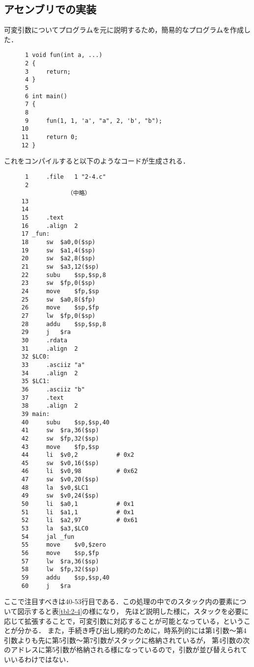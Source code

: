 \documentclass[a4j,11pt]{jarticle}
\begin{document}
\subsection{アセンブリでの実装}

可変引数についてプログラムを元に説明するため，簡易的なプログラムを作成した．

\begin{verbatim}
      1	void fun(int a, ...)
      2	{
      3	    return;
      4	}
      5	
      6	int main()
      7	{
      8	
      9	    fun(1, 1, 'a', "a", 2, 'b', "b");
     10	
     11	    return 0;
     12	}      
\end{verbatim}

これをコンパイルすると以下のようなコードが生成される．

\begin{verbatim}
      1		.file	1 "2-4.c"
      2	
                  （中略）
     13	
     14	
     15		.text
     16		.align	2
     17	_fun:
     18		sw	$a0,0($sp)
     19		sw	$a1,4($sp)
     20		sw	$a2,8($sp)
     21		sw	$a3,12($sp)
     22		subu	$sp,$sp,8
     23		sw	$fp,0($sp)
     24		move	$fp,$sp
     25		sw	$a0,8($fp)
     26		move	$sp,$fp
     27		lw	$fp,0($sp)
     28		addu	$sp,$sp,8
     29		j	$ra
     30		.rdata
     31		.align	2
     32	$LC0:
     33		.asciiz	"a"
     34		.align	2
     35	$LC1:
     36		.asciiz	"b"
     37		.text
     38		.align	2
     39	main:
     40		subu	$sp,$sp,40
     41		sw	$ra,36($sp)
     42		sw	$fp,32($sp)
     43		move	$fp,$sp
     44		li	$v0,2			# 0x2
     45		sw	$v0,16($sp)
     46		li	$v0,98			# 0x62
     47		sw	$v0,20($sp)
     48		la	$v0,$LC1
     49		sw	$v0,24($sp)
     50		li	$a0,1			# 0x1
     51		li	$a1,1			# 0x1
     52		li	$a2,97			# 0x61
     53		la	$a3,$LC0
     54		jal	_fun
     55		move	$v0,$zero
     56		move	$sp,$fp
     57		lw	$ra,36($sp)
     58		lw	$fp,32($sp)
     59		addu	$sp,$sp,40
     60		j	$ra       
\end{verbatim}

ここで注目すべきは40-53行目である．この処理の中でのスタック内の要素について図示すると表\ref{tbl:2-4}の様になり，
先ほど説明した様に，スタックを必要に応じて拡張することで，可変引数に対応することが可能となっている，ということが分かる．
また，手続き呼び出し規約のために，時系列的には第1引数〜第4引数よりも先に第5引数〜第7引数がスタックに格納されているが，
第4引数の次のアドレスに第5引数が格納される様になっているので，引数が並び替えられていいるわけではない．
\end{document}
